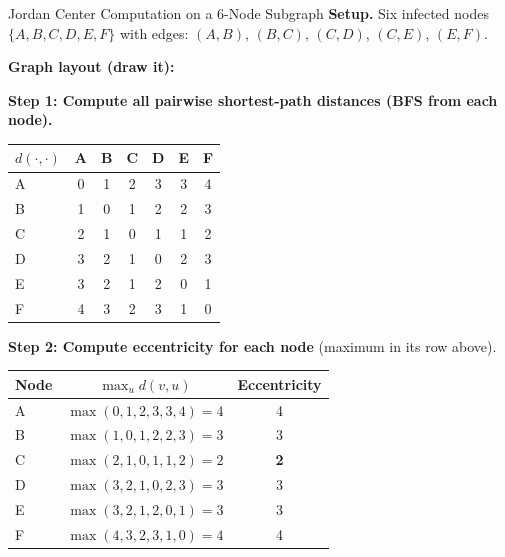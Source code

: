 \begin{examplebox}{Jordan Center Computation on a 6-Node Subgraph}
\textbf{Setup.} Six infected nodes $\{A, B, C, D, E, F\}$ with edges:
$(A,B)$, $(B,C)$, $(C,D)$, $(C,E)$, $(E,F)$.

\textbf{Graph layout (draw it):}
\begin{center}
\end{center}

\textbf{Step 1: Compute all pairwise shortest-path distances (BFS from each node).}

\begin{center}
\small
\begin{tabular}{lcccccc}
\toprule
$d(\cdot, \cdot)$ & A & B & C & D & E & F \\
\midrule
A & 0 & 1 & 2 & 3 & 3 & 4 \\
B & 1 & 0 & 1 & 2 & 2 & 3 \\
C & 2 & 1 & 0 & 1 & 1 & 2 \\
D & 3 & 2 & 1 & 0 & 2 & 3 \\
E & 3 & 2 & 1 & 2 & 0 & 1 \\
F & 4 & 3 & 2 & 3 & 1 & 0 \\
\bottomrule
\end{tabular}
\end{center}

\textbf{Step 2: Compute eccentricity for each node} (maximum in its row above).

\begin{center}
\small
\begin{tabular}{lcc}
\toprule
Node & $\max_u d(v, u)$ & Eccentricity \\
\midrule
A & $\max(0,1,2,3,3,4) = 4$ & 4 \\
B & $\max(1,0,1,2,2,3) = 3$ & 3 \\
C & $\max(2,1,0,1,1,2) = 2$ & \textbf{2} \\
D & $\max(3,2,1,0,2,3) = 3$ & 3 \\
E & $\max(3,2,1,2,0,1) = 3$ & 3 \\
F & $\max(4,3,2,3,1,0) = 4$ & 4 \\
\bottomrule
\end{tabular}
\end{center}


\end{examplebox}
